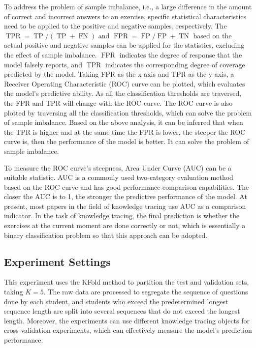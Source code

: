 To address the problem of sample imbalance, i.e., a large difference in the amount of correct and incorrect answers to an exercise, specific statistical characteristics need to be applied to the positive and negative samples, respectively. The \(\operatorname{TPR}=\operatorname{TP}/(\operatorname{TP}+\operatorname{FN})\) and \(\operatorname{FPR}=\operatorname{FP}/\operatorname{FP}+\operatorname{TN}\) based on the actual positive and negative samples can be applied for the statistics, excluding the effect of sample imbalance. \(\operatorname{FPR}\) indicates the degree of response that the model falsely reports, and \(\operatorname{TPR}\) indicates the corresponding degree of coverage predicted by the model. Taking FPR as the x-axis and TPR as the y-axis, a Receiver Operating Characteristic (ROC) curve can be plotted, which evaluates the model's predictive ability. As all the classification thresholds are traversed, the FPR and TPR will change with the ROC curve. The ROC curve is also plotted by traversing all the classification thresholds, which can solve the problem of sample imbalance. Based on the above analysis, it can be inferred that when the TPR is higher and at the same time the FPR is lower, the steeper the ROC curve is, then the performance of the model is better. It can solve the problem of sample imbalance.


To measure the ROC curve's steepness, Area Under Curve (AUC) can be a suitable statistic. AUC is a commonly used two-category evaluation method based on the ROC curve and has good performance comparison capabilities. The closer the AUC is to 1, the stronger the predictive performance of the model. At present, most papers in the field of knowledge tracing use AUC as a comparison indicator. In the task of knowledge tracing, the final prediction is whether the exercises at the current moment are done correctly or not, which is essentially a binary classification problem so that this approach can be adopted.

\subsection{Experiment Settings}
This experiment uses the KFold method to partition the test and validation sets, taking \(K=5\). The raw data are processed to segregate the sequence of questions done by each student, and students who exceed the predetermined longest sequence length are split into several sequences that do not exceed the longest length. Moreover, the experiments can use different knowledge tracing objects for cross-validation experiments, which can effectively measure the model's prediction performance.

